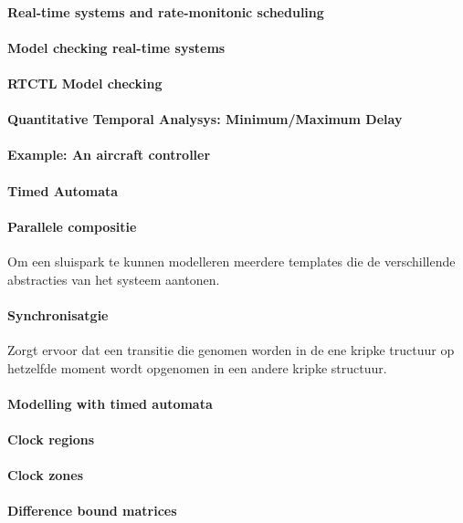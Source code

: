 \paragraph{Real-time systems and rate-monitonic scheduling}
\paragraph{Model checking real-time systems}
\paragraph{RTCTL Model checking}
\paragraph{Quantitative Temporal Analysys: Minimum/Maximum Delay}
\paragraph{Example: An aircraft controller}
\paragraph{Timed Automata}
\paragraph{Parallele compositie}
Om een sluispark te kunnen modelleren meerdere templates die de verschillende abstracties van het systeem aantonen.

\paragraph{Synchronisatgie}
Zorgt ervoor dat  een transitie die genomen worden in de ene kripke tructuur op hetzelfde moment wordt opgenomen in een andere kripke structuur.

\paragraph{Modelling with timed automata}
\paragraph{Clock regions}
\paragraph{Clock zones}
\paragraph{Difference bound matrices}
